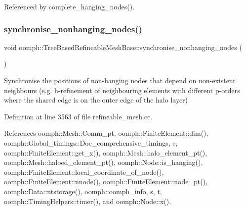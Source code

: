Referenced by complete\+\_\+hanging\+\_\+nodes().

\mbox{\label{classoomph_1_1TreeBasedRefineableMeshBase_ac6091e7d077cf416f296b95f086efe55}} 
\subsubsection{\texorpdfstring{synchronise\+\_\+nonhanging\+\_\+nodes()}{synchronise\_nonhanging\_nodes()}}
{\footnotesize\ttfamily void oomph\+::\+Tree\+Based\+Refineable\+Mesh\+Base\+::synchronise\+\_\+nonhanging\+\_\+nodes (\begin{DoxyParamCaption}{ }\end{DoxyParamCaption})\hspace{0.3cm}{\ttfamily [protected]}}

Synchronise the positions of non-\/hanging nodes that depend on non-\/existent neighbours (e.\+g. h-\/refinement of neighbouring elements with different p-\/orders where the shared edge is on the outer edge of the halo layer) 

Definition at line 3563 of file refineable\+\_\+mesh.\+cc.



References oomph\+::\+Mesh\+::\+Comm\+\_\+pt, oomph\+::\+Finite\+Element\+::dim(), oomph\+::\+Global\+\_\+timings\+::\+Doc\+\_\+comprehensive\+\_\+timings, e, oomph\+::\+Finite\+Element\+::get\+\_\+x(), oomph\+::\+Mesh\+::halo\+\_\+element\+\_\+pt(), oomph\+::\+Mesh\+::haloed\+\_\+element\+\_\+pt(), oomph\+::\+Node\+::is\+\_\+hanging(), oomph\+::\+Finite\+Element\+::local\+\_\+coordinate\+\_\+of\+\_\+node(), oomph\+::\+Finite\+Element\+::nnode(), oomph\+::\+Finite\+Element\+::node\+\_\+pt(), oomph\+::\+Data\+::ntstorage(), oomph\+::oomph\+\_\+info, s, t, oomph\+::\+Timing\+Helpers\+::timer(), and oomph\+::\+Node\+::x().

\mbox{\label{classoomph_1_1TreeBasedRefineableMeshBase_a1ee27bd5bd3c2eded38103b9161af719}} 
